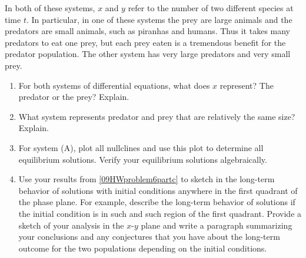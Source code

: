 \begin{enumerate}
In both of these systems, $x$ and $y$ refer to the number of two different species at time $t$. In particular, in one of these systems the prey are large animals and the predators are small animals, such as piranhas and humans. Thus it takes many predators to eat one prey, but each prey eaten is a tremendous benefit for the predator population. The other system has very large predators and very small prey. \label{09HWproblem6}

\begin{enumerate}
\item For both systems of differential equations, what does $x$ represent? The predator or the prey? Explain. \label{09HWproblem6parta}
\item	What system represents predator and prey that are relatively the same size? Explain. \label{09HWproblem6partb}
\item	For system (A), plot all nullclines and use this plot to determine all equilibrium solutions. Verify your equilibrium solutions algebraically.\label{09HWproblem6partc}
\item	Use your results from \ref{09HWproblem6partc} to sketch in the long-term behavior of solutions with initial conditions anywhere in the first quadrant of the phase plane. For example, describe the long-term behavior of solutions if the initial condition is in such and such region of the first quadrant. Provide a sketch of your analysis in the $x$-$y$ plane and write a paragraph summarizing your conclusions and any conjectures that you have about the long-term outcome for the two populations depending on the initial conditions. \label{09HWproblem6partd}
\end{enumerate}

\clearpage


\end{enumerate}
